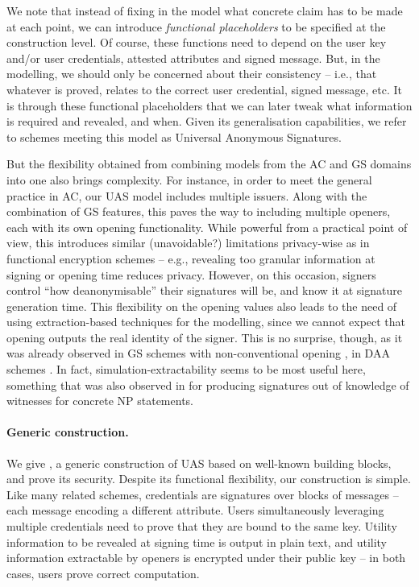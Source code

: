 We note that instead of fixing in the model what concrete claim has to
be made at each point, we can introduce \emph{functional placeholders} to be
specified at the construction level. Of course, these functions need
to depend on the user key and/or user credentials, attested attributes and
signed message. But, in the modelling, we should only be concerned about their
consistency -- i.e., that whatever is proved, relates to the correct user
credential, signed message, etc.
%
It is through these functional placeholders that we can later tweak what
information is required and revealed, and when. Given its generalisation
capabilities, we refer to schemes meeting this model as Universal Anonymous
Signatures.

But the flexibility obtained from combining models from the AC and GS
domains into one also brings complexity. For instance, in order to meet
the general practice in AC, our UAS model includes multiple issuers. Along with
the combination of GS features, this paves the way to including multiple
openers, each with its own opening functionality. While powerful from a
practical point of view, this introduces similar (unavoidable?) limitations
privacy-wise as in functional encryption schemes \cite{bsw11} -- e.g., revealing
too granular information at signing or opening time reduces privacy. However, on
this occasion, signers control ``how deanonymisable'' their signatures will
be, and know it at signature generation time. This flexibility on the opening
values also leads to the need of using extraction-based techniques for the
modelling, since we cannot expect that opening outputs the real identity of the
signer. This is no surprise, though, as it was already observed in GS schemes
with non-conventional opening \cite{dl21}, in DAA schemes \cite{cdl16,cdl16b}.
In fact, simulation-extractability seems to be most useful here, something that
was also observed in \cite{cl06} for producing signatures out of knowledge of
witnesses for concrete NP statements.

\paragraph{Generic construction.} %
We give \CUASGen, a generic construction of UAS based on well-known
building blocks, and prove its security. Despite its functional flexibility, our
construction is simple. Like many related schemes, credentials are
signatures over blocks of messages -- each message encoding a different
attribute. Users simultaneously leveraging multiple credentials need to prove
that they are bound to the same key. Utility information to be revealed at
signing time is output in plain text, and utility information extractable by
openers is encrypted under their public key -- in both cases, users prove
correct computation.

